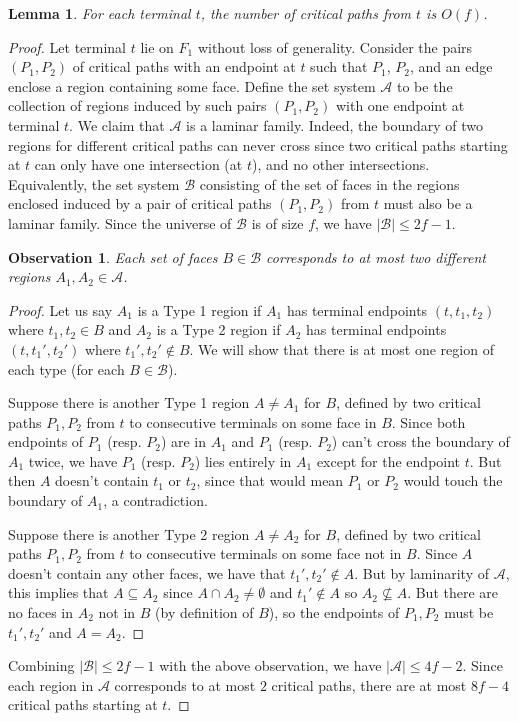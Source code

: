 \documentclass[11pt]{article}
\newtheorem{observation}[theorem]{Observation}
\newtheorem{lemma}[theorem]{Lemma}
\begin{document}
\begin{lemma}
\label{lem: critical}
For each terminal $t$, the number of critical paths from $t$ is $O(f)$.
\end{lemma}
\begin{proof}
Let terminal $t$ lie on $F_1$ without loss of generality. Consider the pairs $(P_1,P_2)$ of critical paths with an endpoint at $t$ such that $P_1$, $P_2$, and an edge enclose a region containing some face.
Define the set system $\mathcal{A}$ to be the collection of regions induced by such pairs $(P_1,P_2)$ with one endpoint at terminal $t$. We claim that $\mathcal{A}$ is a laminar family. Indeed, the boundary of two regions for different critical paths can never cross since two critical paths starting at $t$ can only have one intersection (at $t$), and no other intersections.
Equivalently, the set system $\mathcal{B}$ consisting of the set of faces in the regions enclosed induced by a pair of critical paths $(P_1,P_2)$ from $t$ must also be a laminar family. Since the universe of $\mathcal{B}$ is of size $f$, we have $|\mathcal{B}|\le 2f-1$. 
\begin{observation}
    Each set of faces $B\in\mathcal{B}$ corresponds to at most two different regions $A_1,A_2\in\mathcal{A}$.    
\end{observation}
\begin{proof}
    Let us say $A_1$ is a Type 1 region if $A_1$ has terminal endpoints $(t,t_1,t_2)$ where $t_1,t_2\in B$ and $A_2$ is a Type 2 region if $A_2$ has terminal endpoints $(t,t_1',t_2')$ where $t_1',t_2'\not\in B$. We will show that there is at most one region of each type (for each $B\in\mathcal{B}$).
    
    Suppose there is another Type 1 region $A\neq A_1$ for $B$, defined by two critical paths $P_1,P_2$ from $t$ to consecutive terminals on some face in $B$. Since both endpoints of $P_1$ (resp. $P_2$) are in $A_1$ and $P_1$ (resp. $P_2$) can't cross the boundary of $A_1$ twice, we have $P_1$ (resp. $P_2$) lies entirely in $A_1$ except for the endpoint $t$. But then $A$ doesn't contain $t_1$ or $t_2$, since that would mean $P_1$ or $P_2$ would touch the boundary of $A_1$, a contradiction. 
    
    Suppose there is another Type 2 region $A\neq A_2$ for $B$, defined by two critical paths $P_1,P_2$ from $t$ to consecutive terminals on some face not in $B$. Since $A$ doesn't contain any other faces, we have that $t_1',t_2'\not\in A$. But by laminarity of $\mathcal{A}$, this implies that $A\subseteq A_2$ since $A\cap A_2\neq\emptyset$ and $t_1'\not\in A$ so $A_2\not\subseteq A$. But there are no faces in $A_2$ not in $B$ (by definition of $B$), so the endpoints of $P_1,P_2$ must be $t_1',t_2'$ and $A=A_2$.
\end{proof}
Combining $|\mathcal{B}|\le 2f-1$ with the above observation, we have $|\mathcal{A}|\le 4f-2$. Since each region in $\mathcal{A}$ corresponds to at most $2$ critical paths, there are at most $8f-4$ critical paths starting at $t$.
\end{proof}
\end{document}
